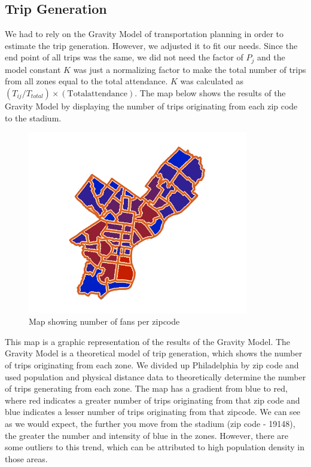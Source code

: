 
\subsection{Trip Generation}

We had to rely on the Gravity Model of transportation planning in
order to estimate the trip generation. However, we adjusted it to fit
our needs. Since the end point of all trips was the same, we did not
need the factor of $P_j$ and the model constant $K$ was just a
normalizing factor to make the total number of trips from all zones
equal to the total attendance. $K$ was calculated as
$(T_{ij}/T_{total}) \times (\mathrm{Total attendance})$. The map below
shows the results of the Gravity Model by displaying the number of
trips originating from each zip code to the stadium.

\begin{figure}[htp]
  \centering
  \includegraphics[height=8cm]{graphics/trip-generation.png}
  \caption{Map showing number of fans per zipcode}
  \label{fig-trip-generation-results}
\end{figure}

This map is a graphic representation of the results of the Gravity Model. The
Gravity Model is a theoretical model of trip generation, which shows the number
of trips originating from each zone. We divided up Philadelphia by zip code and
used population and physical distance data to theoretically determine the number
of trips generating from each zone. The map has a gradient from blue to red,
where red indicates a greater number of trips originating from that zip code and
blue indicates a lesser number of trips originating from that zipcode. We can
see as we would expect, the further you move from the stadium (zip code -
19148), the greater the number and intensity of blue in the zones. However,
there are some outliers to this trend, which can be attributed to high
population density in those areas.

